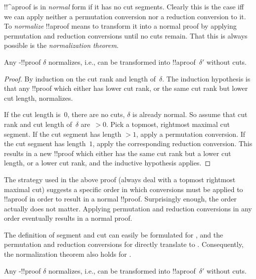 \documentclass[../../../include/open-logic-section]{subfiles}
\begin{document}


!!^a{proof} is in \emph{normal} form if it has no cut segments.
Clearly this is the case iff we can apply neither a permutation
conversion nor a reduction conversion to it. To \emph{normalize}
!!a{proof} means to transform it into a normal proof by applying
permutation and reduction conversions until no cuts remain. That this
is always possible is the \emph{normalization theorem}.

\begin{thm} Any -!!{proof}
$\delta$ normalizes, i.e., can be transformed into
!!a{proof}~$\delta'$ without cuts.
\end{thm}

\begin{proof}
  By induction on the cut rank and length of~$\delta$. The induction
  hypothesis is that any !!{proof} which either has lower cut rank, or
  the same cut rank but lower cut length, normalizes.

  If the cut length is~$0$, there are no cuts, $\delta$ is already
  normal. So assume that cut rank and cut length of~$\delta$ are~$>
  0$. Pick a topmost, rightmost maximal cut segment. If the cut
  segment has length $>1$, apply a permutation conversion. If the cut
  segment has length~$1$, apply the corresponding reduction
  conversion. This results in a new !!{proof} which either has the
  same cut rank but a lower cut length, or a lower cut rank, and the
  inductive hypothesis applies.
\end{proof}

The strategy used in the above proof (always deal with a
topmost rightmost maximal cut) suggests a specific order in which
conversions must be applied to !!a{proof} in order to result in a
normal !!{proof}. Surprisingly enough, the order actually does not
matter. Applying permutation and reduction conversions in any order
eventually results in a normal proof.

The definition of segment and cut can easily be formulated for
, and the permutation and reduction conversions for 
directly translate to . Consequently, the normalization
theorem also holds for .

\begin{thm} Any -!!{proof}
$\delta$ normalizes, i.e., can be transformed into
!!a{proof}~$\delta'$ without cuts.
\end{thm}
\end{document}
